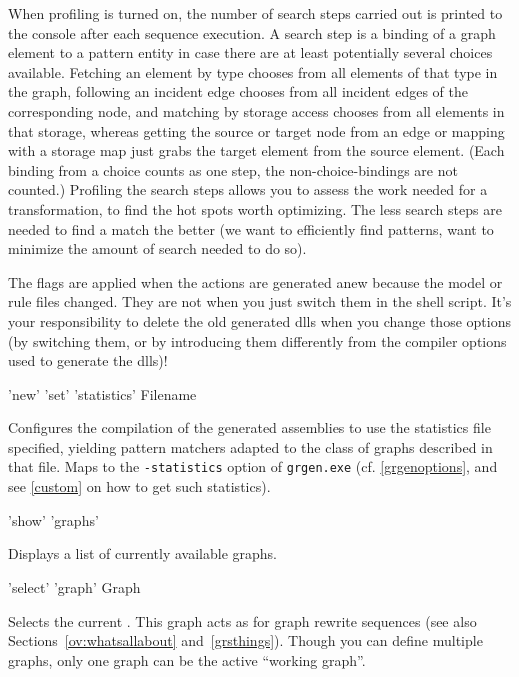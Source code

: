 When profiling is turned on, the number of search steps carried out is printed to the console after each sequence execution.
A search step is a binding of a graph element to a pattern entity in case there are at least potentially several choices available.
Fetching an element by type chooses from all elements of that type in the graph, following an incident edge chooses from all incident edges of the corresponding node, and matching by storage access chooses from all elements in that storage, whereas getting the source or target node from an edge or mapping with a storage map just grabs the target element from the source element.
(Each binding from a choice counts as one step, the non-choice-bindings are not counted.)
Profiling the search steps allows you to assess the work needed for a transformation, to find the hot spots worth optimizing.
The less search steps are needed to find a match the better (we want to efficiently find patterns, want to minimize the amount of search needed to do so). 

The flags are applied when the actions are generated anew because the model or rule files changed. They are not when you just switch them in the shell script. It's your responsibility to delete the old generated dlls when you change those options (by switching them, or by introducing them differently from the compiler options used to generate the dlls)!

\begin{rail}
  'new' 'set' 'statistics' Filename
\end{rail}
Configures the compilation of the generated assemblies to use the statistics file specified, yielding pattern matchers adapted to the class of graphs described in that file.
Maps to the \texttt{-statistics} option of \texttt{grgen.exe} (cf. \ref{grgenoptions}, and see \ref{custom} on how to get such statistics).

\begin{rail}
  'show' 'graphs'
\end{rail}
Displays a list of currently available graphs.

\begin{rail}
  'select' 'graph' Graph
\end{rail}
Selects the current .
This graph acts as \emph{} for graph rewrite sequences (see also Sections~\ref{ov:whatsallabout} and~\ref{grsthings}).
Though you can define multiple graphs, only one graph can be the active ``working graph''.

